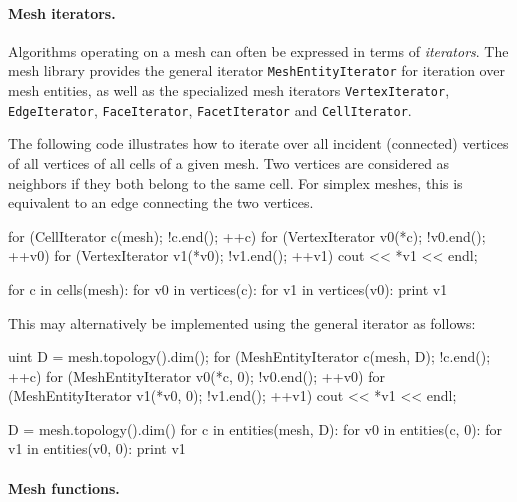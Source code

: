 \paragraph{Mesh iterators.}

Algorithms operating on a mesh can often be expressed in terms of
\emph{iterators}. The mesh library provides the general iterator
\texttt{MeshEntityIterator} for iteration over mesh entities,
as well as the specialized mesh iterators \texttt{VertexIterator},
\texttt{EdgeIterator}, \texttt{FaceIterator}, \texttt{FacetIterator}
and \texttt{Cell\-Iterator}.

The following code illustrates how to iterate over all incident
(connected) vertices of all vertices of all cells of a given
mesh. Two vertices are considered as neighbors if
they both belong to the same cell. For simplex meshes, this is equivalent
to an edge connecting the two vertices.
\begin{c++}
for (CellIterator c(mesh); !c.end(); ++c)
  for (VertexIterator v0(*c); !v0.end(); ++v0)
    for (VertexIterator v1(*v0); !v1.end(); ++v1)
      cout << *v1 << endl;
\end{c++}
\begin{python}
for c in cells(mesh):
    for v0 in vertices(c):
        for v1 in vertices(v0):
            print v1
\end{python}
This may alternatively be implemented using the general iterator
 as follows:
\begin{c++}
uint D = mesh.topology().dim();
for (MeshEntityIterator c(mesh, D); !c.end(); ++c)
  for (MeshEntityIterator v0(*c, 0); !v0.end(); ++v0)
    for (MeshEntityIterator v1(*v0, 0); !v1.end(); ++v1)
      cout << *v1 << endl;
\end{c++}
\begin{python}
D = mesh.topology().dim()
for c in entities(mesh, D):
    for v0 in entities(c, 0):
        for v1 in entities(v0, 0):
            print v1
\end{python}

\paragraph{Mesh functions.}

